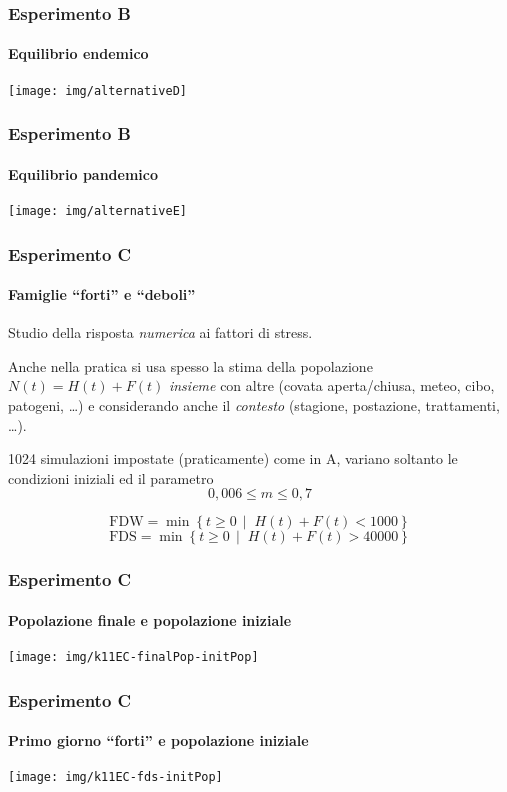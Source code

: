 \documentclass[]{beamer}
\newcommand{\st}{\,\mid\;}
\begin{document}
\begin{frame}
    \frametitle{Esperimento B}
    \framesubtitle{Equilibrio endemico}

    \begin{center}
        \texttt{[image: img/alternativeD]}
    \end{center}
\end{frame}

\begin{frame}
    \frametitle{Esperimento B}
    \framesubtitle{Equilibrio pandemico}

    \begin{center}
        \texttt{[image: img/alternativeE]}
    \end{center}
\end{frame}

\begin{frame}
    \frametitle{Esperimento C}
    \framesubtitle{Famiglie ``forti'' e ``deboli''}

    Studio della risposta \emph{numerica} ai fattori di stress.

    Anche nella pratica si usa spesso la stima della popolazione $N(t)=H(t)+F(t)$
    \pause
    \emph{insieme} con altre (covata aperta/chiusa, meteo, cibo, patogeni, \dots)
    \pause
    e considerando anche il \emph{contesto} (stagione, postazione, trattamenti, \dots).

    \pause
    \vspace{0.5em}
    1024 simulazioni impostate (praticamente) come in A,
    variano soltanto le condizioni iniziali ed il parametro
    $$ 0,006 \leq m \leq 0,7$$

    \pause
    $$\text{FDW} = \min \left\{ t \geq 0 \st H(t) + F(t) < 1000 \right\} $$
    \pause
    $$\text{FDS} = \min \left\{ t \geq 0 \st H(t) + F(t) > 40000 \right\} $$
\end{frame}

\begin{frame}
    \frametitle{Esperimento C}
    \framesubtitle{Popolazione finale e popolazione iniziale}

    \begin{center}
        \texttt{[image: img/k11EC-finalPop-initPop]}
    \end{center}
\end{frame}

\begin{frame}
    \frametitle{Esperimento C}
    \framesubtitle{Primo giorno ``forti'' e popolazione iniziale}

    \begin{center}
        \texttt{[image: img/k11EC-fds-initPop]}
    \end{center}
\end{frame}
\end{document}
